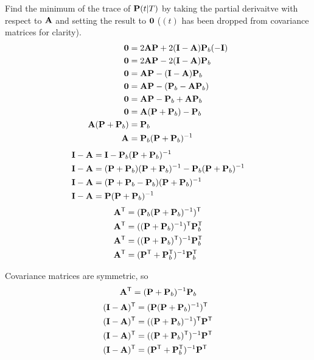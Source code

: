 Find the minimum of the trace of $\mathbf{P}(t|T)$ by taking the partial derivaitve
with respect to $\mathbf{A}$ and setting the result to $\mathbf{0}$ ($(t)$ has been
dropped from covariance matrices for clarity).
\begin{align}
  \mathbf{0} &= 2\mathbf{A}\mathbf{P} + 2(\mathbf{I} - \mathbf{A})\mathbf{P}_b(-\mathbf{I}) \nonumber
    \\
  \mathbf{0} &= 2\mathbf{A}\mathbf{P} - 2(\mathbf{I} - \mathbf{A})\mathbf{P}_b \nonumber \\
  \mathbf{0} &= \mathbf{A}\mathbf{P} - (\mathbf{I} - \mathbf{A})\mathbf{P}_b \nonumber \\
  \mathbf{0} &= \mathbf{A}\mathbf{P} - (\mathbf{P}_b - \mathbf{A}\mathbf{P}_b) \nonumber \\
  \mathbf{0} &= \mathbf{A}\mathbf{P} - \mathbf{P}_b + \mathbf{A}\mathbf{P}_b \nonumber \\
  \mathbf{0} &= \mathbf{A}(\mathbf{P} + \mathbf{P}_b) - \mathbf{P}_b \nonumber \\
  \mathbf{A}(\mathbf{P} + \mathbf{P}_b) &= \mathbf{P}_b \nonumber \\
  \mathbf{A} &= \mathbf{P}_b(\mathbf{P} + \mathbf{P}_b)^{-1} \label{eq:ks_a1}
\end{align}
\begin{align}
  \mathbf{I} - \mathbf{A} &= \mathbf{I} - \mathbf{P}_b(\mathbf{P} + \mathbf{P}_b)^{-1} \nonumber
    \\
  \mathbf{I} - \mathbf{A} &= (\mathbf{P} + \mathbf{P}_b)(\mathbf{P} + \mathbf{P}_b)^{-1} -
    \mathbf{P}_b(\mathbf{P} + \mathbf{P}_b)^{-1} \nonumber \\
  \mathbf{I} - \mathbf{A} &= (\mathbf{P} + \mathbf{P}_b - \mathbf{P}_b)
    (\mathbf{P} + \mathbf{P}_b)^{-1} \nonumber \\
  \mathbf{I} - \mathbf{A} &= \mathbf{P}(\mathbf{P} + \mathbf{P}_b)^{-1}
\end{align}
\begin{align*}
  \mathbf{A}^\mathsf{T} &= (\mathbf{P}_b(\mathbf{P} + \mathbf{P}_b)^{-1})^\mathsf{T} \\
  \mathbf{A}^\mathsf{T} &= ((\mathbf{P} + \mathbf{P}_b)^{-1})^\mathsf{T}\mathbf{P}_b^\mathsf{T} \\
  \mathbf{A}^\mathsf{T} &= ((\mathbf{P} + \mathbf{P}_b)^\mathsf{T})^{-1}\mathbf{P}_b^\mathsf{T} \\
  \mathbf{A}^\mathsf{T} &= (\mathbf{P}^\mathsf{T} + \mathbf{P}_b^\mathsf{T})^{-1}\mathbf{P}_b^\mathsf{T}
\end{align*}

Covariance matrices are symmetric, so
\begin{equation}
  \mathbf{A}^\mathsf{T} = (\mathbf{P} + \mathbf{P}_b)^{-1}\mathbf{P}_b
\end{equation}
\begin{align*}
  (\mathbf{I} - \mathbf{A})^\mathsf{T} &= (\mathbf{P}(\mathbf{P} + \mathbf{P}_b)^{-1})^\mathsf{T} \\
  (\mathbf{I} - \mathbf{A})^\mathsf{T} &= ((\mathbf{P} + \mathbf{P}_b)^{-1})^\mathsf{T}\mathbf{P}^\mathsf{T} \\
  (\mathbf{I} - \mathbf{A})^\mathsf{T} &= ((\mathbf{P} + \mathbf{P}_b)^\mathsf{T})^{-1}\mathbf{P}^\mathsf{T} \\
  (\mathbf{I} - \mathbf{A})^\mathsf{T} &= (\mathbf{P}^\mathsf{T} + \mathbf{P}_b^\mathsf{T})^{-1}\mathbf{P}^\mathsf{T}
\end{align*}

